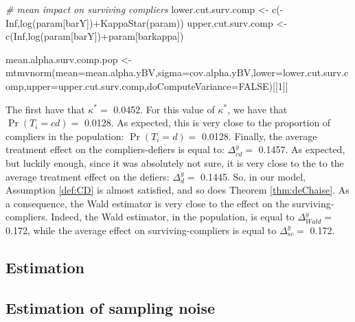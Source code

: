 \documentclass[
]{book}
\newenvironment{Shaded}{\begin{snugshade}}{\end{snugshade}}
\newcommand{\AttributeTok}[1]{\textcolor[rgb]{0.77,0.63,0.00}{#1}}
\newcommand{\CommentTok}[1]{\textcolor[rgb]{0.56,0.35,0.01}{\textit{#1}}}
\newcommand{\ConstantTok}[1]{\textcolor[rgb]{0.00,0.00,0.00}{#1}}
\newcommand{\DecValTok}[1]{\textcolor[rgb]{0.00,0.00,0.81}{#1}}
\newcommand{\FunctionTok}[1]{\textcolor[rgb]{0.00,0.00,0.00}{#1}}
\newcommand{\NormalTok}[1]{#1}
\newcommand{\OtherTok}[1]{\textcolor[rgb]{0.56,0.35,0.01}{#1}}
\newcommand{\SpecialCharTok}[1]{\textcolor[rgb]{0.00,0.00,0.00}{#1}}
\newcommand{\StringTok}[1]{\textcolor[rgb]{0.31,0.60,0.02}{#1}}
\theoremstyle{definition}
\theoremstyle{definition}
\theoremstyle{definition}
\theoremstyle{definition}
\theoremstyle{remark}
\begin{document}
\begin{Shaded}
\begin{Highlighting}[]
\CommentTok{\# mean impact on surviving compliers}
\NormalTok{lower.cut.surv.comp }\OtherTok{\textless{}{-}} \FunctionTok{c}\NormalTok{(}\SpecialCharTok{{-}}\ConstantTok{Inf}\NormalTok{,}\FunctionTok{log}\NormalTok{(param[}\StringTok{\textquotesingle{}barY\textquotesingle{}}\NormalTok{])}\SpecialCharTok{+}\FunctionTok{KappaStar}\NormalTok{(param))}
\NormalTok{upper.cut.surv.comp }\OtherTok{\textless{}{-}} \FunctionTok{c}\NormalTok{(}\ConstantTok{Inf}\NormalTok{,}\FunctionTok{log}\NormalTok{(param[}\StringTok{\textquotesingle{}barY\textquotesingle{}}\NormalTok{])}\SpecialCharTok{+}\NormalTok{param[}\StringTok{\textquotesingle{}barkappa\textquotesingle{}}\NormalTok{])}

\NormalTok{mean.alpha.surv.comp.pop }\OtherTok{\textless{}{-}} \FunctionTok{mtmvnorm}\NormalTok{(}\AttributeTok{mean=}\NormalTok{mean.alpha.yBV,}\AttributeTok{sigma=}\NormalTok{cov.alpha.yBV,}\AttributeTok{lower=}\NormalTok{lower.cut.surv.comp,}\AttributeTok{upper=}\NormalTok{upper.cut.surv.comp,}\AttributeTok{doComputeVariance=}\ConstantTok{FALSE}\NormalTok{)[[}\DecValTok{1}\NormalTok{]]}
\end{Highlighting}
\end{Shaded}

The first have that \(\kappa^*=\) 0.0452.
For this value of \(\kappa^*\), we have that \(\Pr(T_i=cd)=\) 0.0128.
As expected, this is very close to the proportion of compliers in the population: \(\Pr(T_i=d)=\) 0.0128.
Finally, the average treatment effect on the compliers-defiers is equal to: \(\Delta^y_{cd}=\) 0.1457.
As expected, but luckily enough, since it was absolutely not sure, it is very close to the to the average treatment effect on the defiers: \(\Delta^y_{d}=\) 0.1445.
So, in our model, Assumption \ref{def:CD} is almost satisfied, and so does Theorem \ref{thm:deChaise}.
As a consequence, the Wald estimator is very close to the effect on the surviving-compliers.
Indeed, the Wald estimator, in the population, is equal to \(\Delta^y_{Wald}=\) 0.172, while the average effect on surviving-compliers is equal to \(\Delta^y_{sc}=\) 0.172.

\hypertarget{estimation}{%
\subsection{Estimation}\label{estimation}}

\hypertarget{estimation-of-sampling-noise}{%
\subsection{Estimation of sampling noise}\label{estimation-of-sampling-noise}}
\end{document}

